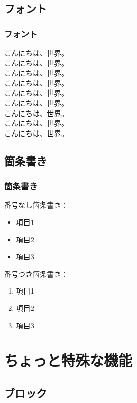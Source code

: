 \documentclass[dvipdfmx,cjk,xcolor=dvipsnames,envcountsect,notheorems,12pt]{beamer}
\theoremstyle{definition}
\begin{document}
\subsection{フォント}

\begin{frame}
  \frametitle{フォント}
  {\scriptsize こんにちは、世界。}\\
  {\footnotesize こんにちは、世界。}\\
  {\small こんにちは、世界。}\\
  こんにちは、世界。\\%
  {\large こんにちは、世界。}\\
  {\Large こんにちは、世界。}\\
  {\LARGE こんにちは、世界。}\\
  {\Huge こんにちは、世界。}
  \vfill%
  \\%
  \alert{こんにちは、世界。}%
\end{frame}

\subsection{箇条書き}

\begin{frame}
  \frametitle{箇条書き}
  番号なし箇条書き：
  \begin{itemize}
  \item 項目1
  \item 項目2
  \item 項目3
  \end{itemize}
  番号つき箇条書き：
  \begin{enumerate}
  \item 項目1
  \item 項目2
  \item 項目3
  \end{enumerate}
\end{frame}

\section{ちょっと特殊な機能}

\subsection{ブロック}
\end{document}
